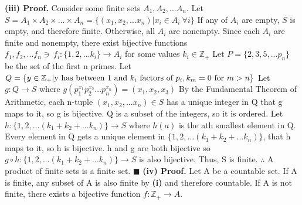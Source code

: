 \documentclass[12pt]{article}
\begin{document}
	\textbf{(iii) Proof.} Consider some finite sets \(A_1,A_2,...A_n\).
	\newline
	Let \(S=A_1 \times A_2 \times ...\times A_n = \{(x_1,x_2,...x_n)| x_i \in A_i\ \forall i\}\) \newline
	If any of \(A_i\) are empty, \(S\) is empty, and therefore finite.
	\newline
	Otherwise, all \(A_i\) are nonempty.
	Since each \(A_i\) are finite and nonempty, there exist bijective functions
	\(f_1,f_2,...f_n\ni\ f_i:\{1,2,...k_i\}\rightarrow A_i\) for some values \(k_i\in \mathbb{Z}_+\)
	\newline \newline
	Let \(P = \{2,3,5,...p_n\}\) be the set of the first n primes.
	\newline
	Let \(Q = \{y\in \mathbb{Z}_+ | \textup{y has between 1 and } k_i \textup{ factors of }p_i, k_m = 0\textup{ for }m > n\}\) \newline
	\newline
	Let \(g: Q \rightarrow S\) where \(g(p_1^{x_1}p_2^{x_2}...p_n^{x_n})=(x_1,x_2,x_3)\)
	\newline
	By the Fundamental Theorem of Arithmetic, each n-tuple \((x_1,x_2,...x_n) \in S\) has a unique integer in Q that g maps to it, so g is bijective. \newline \newline
	Q is a subset of the integers, so it is ordered.
	\newline
	Let \(h: \{1,2,...(k_1+k_2+...k_n)\} \rightarrow S\) where \(h(a)\) is the ath smallest element in Q.
	\newline
	Every element in Q gets a unique element in \(\{1,2,...(k_1+k_2+...k_n)\}\), that h maps to it, so h is bijective.
	\newline \newline
	h and g are both bijective so \(g \circ h : \{1,2,...(k_1+k_2+...k_n)\} \rightarrow S\) is also bijective.
	\newline
	Thus, S is finite.
	\newline
	\(\therefore\) A product of finite sets is a finite set.
	\newline \(\blacksquare\) \newline \newline
	\textbf{(iv) Proof.} Let A be a countable set.
	\newline
	If A is finite, any subset of A is also finite by \textbf{(i)} and therefore countable. \newline
	If A is not finite, there exists a bijective function \(f: \mathbb{Z}_+ \rightarrow A\). \newline
\end{document}
